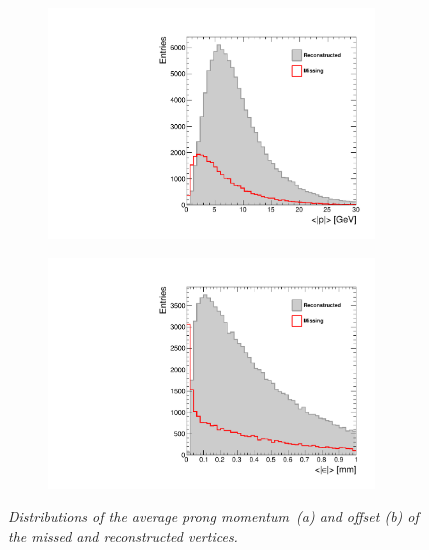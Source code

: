 \begin{figure}[h]
\centering
\begin{subfigure}{0.5\textwidth}
    \includegraphics[width=0.95\textwidth]{ILD/plots/rec-missed-p-vtx.pdf}
\caption{\label{fig:RecMissedParams_a_3} }
\end{subfigure}%
  \begin{subfigure}{0.5\textwidth}
\centering
    \includegraphics[width=0.95\textwidth]{ILD/plots/rec-missed-s-vtx.pdf}
\caption{\label{fig:RecMissedParams_b_3} }
\end{subfigure}
    \caption{\sl Distributions of the average prong momentum~(a) and offset (b) of the missed and reconstructed vertices. }
    \label{fig:RecMissedParams_3}
\end{figure}

